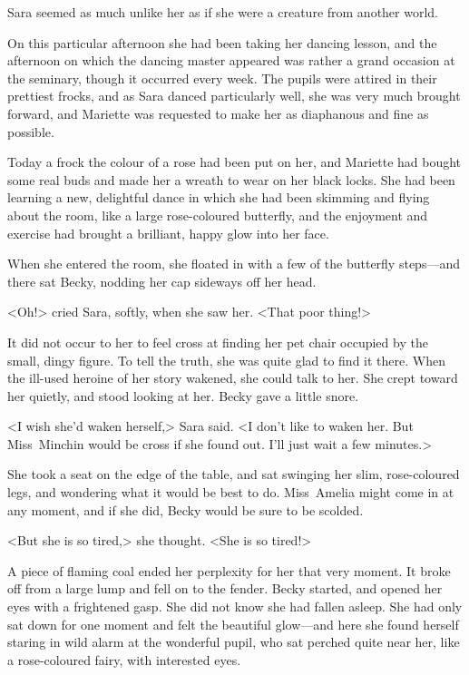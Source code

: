 Sara seemed as much unlike her as if she were a creature from another world.

On this particular afternoon she had been taking her dancing lesson, and the afternoon on which the dancing master appeared was rather a grand occasion at the seminary, though it occurred every week. The pupils were attired in their prettiest frocks, and as Sara danced particularly well, she was very much brought forward, and Mariette was requested to make her as diaphanous and fine as possible.

Today a frock the colour of a rose had been put on her, and Mariette had bought some real buds and made her a wreath to wear on her black locks. She had been learning a new, delightful dance in which she had been skimming and flying about the room, like a large rose-coloured butterfly, and the enjoyment and exercise had brought a brilliant, happy glow into her face.

When she entered the room, she floated in with a few of the butterfly steps—and there sat Becky, nodding her cap sideways off her head.

<Oh!> cried Sara, softly, when she saw her. <That poor thing!>

It did not occur to her to feel cross at finding her pet chair occupied by the small, dingy figure. To tell the truth, she was quite glad to find it there. When the ill-used heroine of her story wakened, she could talk to her. She crept toward her quietly, and stood looking at her. Becky gave a little snore.

<I wish she'd waken herself,> Sara said. <I don't like to waken her. But Miss~Minchin would be cross if she found out. I'll just wait a few minutes.>

She took a seat on the edge of the table, and sat swinging her slim, rose-coloured legs, and wondering what it would be best to do. Miss~Amelia might come in at any moment, and if she did, Becky would be sure to be scolded.

<But she is so tired,> she thought. <She is so tired!>

A piece of flaming coal ended her perplexity for her that very moment. It broke off from a large lump and fell on to the fender. Becky started, and opened her eyes with a frightened gasp. She did not know she had fallen asleep. She had only sat down for one moment and felt the beautiful glow—and here she found herself staring in wild alarm at the wonderful pupil, who sat perched quite near her, like a rose-coloured fairy, with interested eyes.


